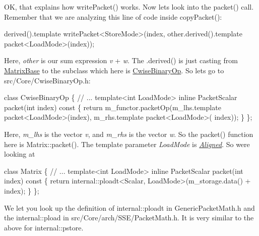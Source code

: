 OK, that explains how write\+Packet() works. Now let\textquotesingle{}s look into the packet() call. Remember that we are analyzing this line of code inside copy\+Packet()\+: 
\begin{DoxyCode}
derived().template writePacket<StoreMode>(index,
    other.derived().template packet<LoadMode>(index));
\end{DoxyCode}


Here, {\itshape other} is our sum expression {\itshape v} + {\itshape w}. The .derived() is just casting from \hyperlink{group___core___module_class_eigen_1_1_matrix_base}{Matrix\+Base} to the subclass which here is \hyperlink{group___core___module_class_eigen_1_1_cwise_binary_op}{Cwise\+Binary\+Op}. So let\textquotesingle{}s go to src/\+Core/\+Cwise\+Binary\+Op.\+h\+: 
\begin{DoxyCode}
\textcolor{keyword}{class }CwiseBinaryOp
\{
  \textcolor{comment}{// ...}
    \textcolor{keyword}{template}<\textcolor{keywordtype}{int} LoadMode>
    \textcolor{keyword}{inline} PacketScalar packet(\textcolor{keywordtype}{int} index)\textcolor{keyword}{ const}
\textcolor{keyword}{    }\{
      \textcolor{keywordflow}{return} m\_functor.packetOp(m\_lhs.template packet<LoadMode>(index), m\_rhs.template packet<LoadMode>(
      index));
    \}
\};
\end{DoxyCode}
 Here, {\itshape m\+\_\+lhs} is the vector {\itshape v}, and {\itshape m\+\_\+rhs} is the vector {\itshape w}. So the packet() function here is Matrix\+::packet(). The template parameter {\itshape Load\+Mode} is {\itshape \hyperlink{group__enums_gga45fe06e29902b7a2773de05ba27b47a1ad37d4c71425bb286e9b4103830538fbf}{Aligned}}. So we\textquotesingle{}re looking at 
\begin{DoxyCode}
\textcolor{keyword}{class }Matrix
\{
  \textcolor{comment}{// ...}
    \textcolor{keyword}{template}<\textcolor{keywordtype}{int} LoadMode>
    \textcolor{keyword}{inline} PacketScalar packet(\textcolor{keywordtype}{int} index)\textcolor{keyword}{ const}
\textcolor{keyword}{    }\{
      \textcolor{keywordflow}{return} internal::ploadt<Scalar, LoadMode>(m\_storage.data() + index);
    \}
\};
\end{DoxyCode}
 We let you look up the definition of internal\+::ploadt in Generic\+Packet\+Math.\+h and the internal\+::pload in src/\+Core/arch/\+S\+S\+E/\+Packet\+Math.\+h. It is very similar to the above for internal\+::pstore.

